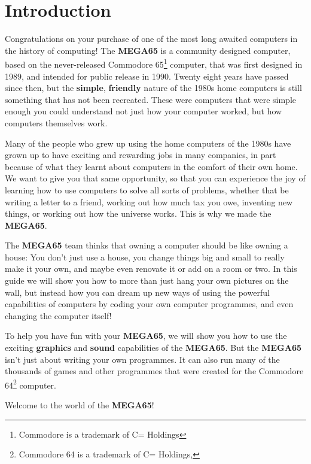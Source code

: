 \chapter{Introduction}

Congratulations on your purchase of one of the most long awaited computers in the history of computing!
The {\bf MEGA65} is a community designed computer, based on the never-released Commodore{\texttrademark}
65\footnote{Commodore is a trademark of C= Holdings} computer, that was first designed in
1989, and intended for public release in 1990.  Twenty eight years have passed since then,
but the {\bf simple}, {\bf friendly} nature of the 1980s home computers is still something that has not
been recreated.  These were computers that were simple enough you could understand not just
how your computer worked, but how computers themselves work.

Many of the people who grew
up using the home computers of the 1980s have grown up to have exciting and rewarding jobs in many companies,
in part because of what they learnt about computers in the comfort of their own home.  We
want to give you that same opportunity, so that you can experience the joy of learning how
to use computers to solve all sorts of problems, whether that be writing a letter to a friend,
working out how much tax you owe, inventing new things, or working out how the universe works.
This is why we made the {\bf MEGA65}.

The {\bf MEGA65} team thinks that owning a computer should
be like owning a house: You don't just use a house, you change things big and small to really
make it your own, and maybe even renovate it or add on a room or two.  In this guide we will
show you how to more than just hang your own pictures on the wall, but instead how you can dream
up new ways of using the powerful capabilities of computers by coding your own computer programmes,
and even changing the computer itself!

To help you have fun with your {\bf MEGA65}, we will show you how to use the exciting {\bf graphics} and {\bf sound}
capabilities of the {\bf MEGA65}.  But the {\bf MEGA65} isn't just about writing your own programmes.
It can also run many of the thousands of games and other programmes that were created for the
Commodore 64{\texttrademark}\footnote{Commodore 64 is a trademark of C= Holdings, } computer.

Welcome to the world of the {\bf MEGA65}!


